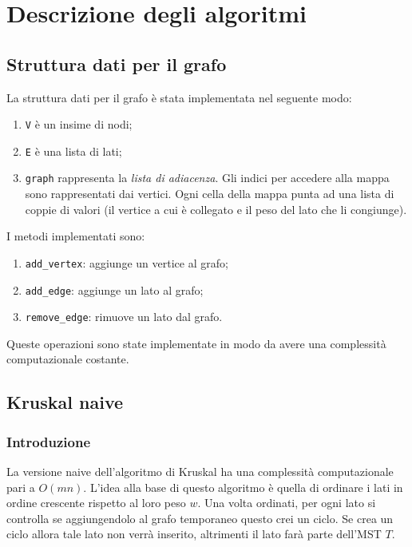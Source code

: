 \section{Descrizione degli algoritmi}

\subsection{Struttura dati per il grafo}

La struttura dati per il grafo è stata implementata nel seguente
modo:
\begin{enumerate}
    \item \verb|V| è un insime di nodi;
    \item \verb|E| è una lista di lati;
    \item \verb|graph| rappresenta la \textit{lista di adiacenza}.
    Gli indici per accedere alla mappa sono rappresentati dai vertici.
    Ogni cella della mappa punta ad una lista di coppie di valori
    (il vertice a cui è collegato e il peso del lato che li
    congiunge).
\end{enumerate}

I metodi implementati sono:
\begin{enumerate}
    \item \verb|add_vertex|: aggiunge un vertice al grafo;
    \item \verb|add_edge|: aggiunge un lato al grafo;
    \item \verb|remove_edge|: rimuove un lato dal grafo.
\end{enumerate}
Queste operazioni sono state implementate in modo da avere una
complessità computazionale costante.

\subsection{Kruskal naive}

\subsubsection{Introduzione}

La versione naive dell'algoritmo di Kruskal ha una complessità
computazionale pari a $O(mn)$. L'idea alla base di questo
algoritmo è quella di ordinare i lati in ordine crescente rispetto al
loro peso $w$. Una volta ordinati, per ogni lato si controlla se
aggiungendolo al grafo temporaneo questo crei un ciclo. Se crea un
ciclo allora tale lato non verrà inserito, altrimenti il lato farà
parte dell'MST $T$.

